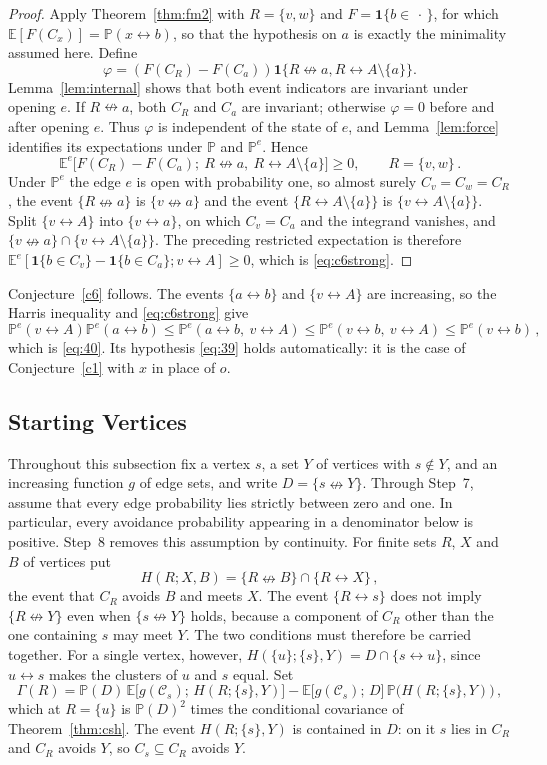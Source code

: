 \documentclass[11pt]{article}
\theoremstyle{definition}
\theoremstyle{remark}
\newcommand{\PP}{\mathbb P}
\newcommand{\EE}{\mathbb E}
\newcommand{\one}{\mathbf 1}
\newcommand{\con}{\leftrightarrow}
\newcommand{\ncon}{\nleftrightarrow}
\newcommand{\eC}{\mathcal C}
\begin{document}
\begin{proof}
Apply Theorem~\ref{thm:fm2} with $R=\{v,w\}$ and $F=\one\{b\in\,\cdot\,\}$, for which
$\EE[F(C_x)]=\PP(x\con b)$, so that the hypothesis on $a$ is exactly the minimality assumed
here. Define
\[
 \varphi=(F(C_R)-F(C_a))\one\{R\ncon a,R\con A\setminus\{a\}\}.
\]
Lemma~\ref{lem:internal} shows that both event indicators are invariant under opening $e$.
If $R\ncon a$, both $C_R$ and $C_a$ are invariant; otherwise $\varphi=0$ before and after
opening $e$. Thus $\varphi$ is independent of the state of $e$, and Lemma~\ref{lem:force}
identifies its expectations under $\PP$ and $\PP^e$. Hence
\[
 \EE^e\bigl[F(C_R)-F(C_a);\ R\ncon a,\ R\con A\setminus\{a\}\bigr]\geq 0,\qquad R=\{v,w\}\,.
\]
Under $\PP^e$ the edge $e$ is open with probability one, so almost surely $C_v=C_w=C_R$,
the event $\{R\ncon a\}$ is $\{v\ncon a\}$ and the event $\{R\con A\setminus\{a\}\}$ is
$\{v\con A\setminus\{a\}\}$. Split $\{v\con A\}$ into $\{v\con a\}$, on which $C_v=C_a$ and
the integrand vanishes, and $\{v\ncon a\}\cap\{v\con A\setminus\{a\}\}$. The preceding
restricted expectation is therefore
$\EE^e[\one\{b\in C_v\}-\one\{b\in C_a\};v\con A]\geq0$, which is
\eqref{eq:c6strong}.
\end{proof}

Conjecture~\ref{c6} follows. The events $\{a\con b\}$ and $\{v\con A\}$ are increasing, so
the Harris inequality and \eqref{eq:c6strong} give
\[
 \PP^e(v\con A)\PP^e(a\con b)\leq \PP^e(a\con b,\ v\con A)\leq
 \PP^e(v\con b,\ v\con A)\leq \PP^e(v\con b)\,,
\]
which is \eqref{eq:40}. Its hypothesis \eqref{eq:39} holds automatically: it is the case of
Conjecture~\ref{c1} with $x$ in place of $o$.

\subsection{Starting Vertices}\label{ss:chain}

Throughout this subsection fix a vertex $s$, a set $Y$ of vertices with $s\notin Y$, and an
increasing function $g$ of edge sets, and write $D=\{s\ncon Y\}$. Through Step~7, assume
that every edge probability lies strictly between zero and one. In particular, every
avoidance probability appearing in a denominator below is positive. Step~8 removes this
assumption by continuity. For finite sets $R$,
$X$ and $B$ of vertices put
\[
 H(R;X,B)=\{R\ncon B\}\cap\{R\con X\}\,,
\]
the event that $C_R$ avoids $B$ and meets $X$. The event $\{R\con s\}$ does not imply
$\{R\ncon Y\}$ even when $\{s\ncon Y\}$ holds, because a component of $C_R$ other than the
one containing $s$ may meet $Y$. The two conditions must therefore be carried together. For
a single vertex, however, $H(\{u\};\{s\},Y)=D\cap\{s\con u\}$, since $u\con s$ makes the
clusters of $u$ and $s$ equal. Set
\begin{equation}\label{eq:gamma}
 \Gamma(R)=\PP(D)\,\EE\bigl[g(\eC_s);\,H(R;\{s\},Y)\bigr]
 -\EE\bigl[g(\eC_s);\,D\bigr]\,\PP\bigl(H(R;\{s\},Y)\bigr)\,,
\end{equation}
which at $R=\{u\}$ is $\PP(D)^2$ times the conditional covariance of
Theorem~\ref{thm:csh}. The event $H(R;\{s\},Y)$ is contained in $D$: on it $s$ lies in
$C_R$ and $C_R$ avoids $Y$, so $C_s\subseteq C_R$ avoids $Y$.
\end{document}
